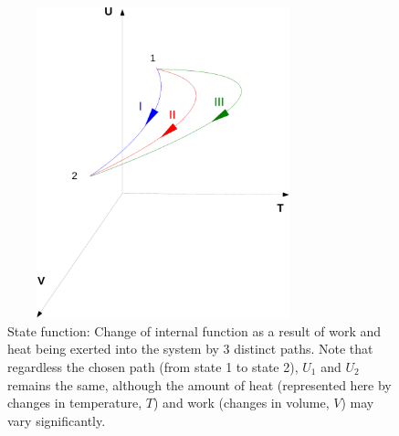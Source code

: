    \begin{figure}[h]
     \begin{center}
       \includegraphics[width=9cm, height=9cm]{./Figs/Chp3_State-PathFunctions}
        \caption{State function: Change of internal function as a result of work and heat being exerted into the system by 3 distinct paths. Note that regardless the chosen path (from state 1 to state 2), $U_{1}$ and $U_{2}$ remains the same, although the amount of heat (represented here by changes in temperature, $T$) and work (\ie changes in volume, $V$) may vary significantly.}\label{Chapter:FirstLaw:Fig:StateFunctions}
     \end{center}
   \end{figure}
